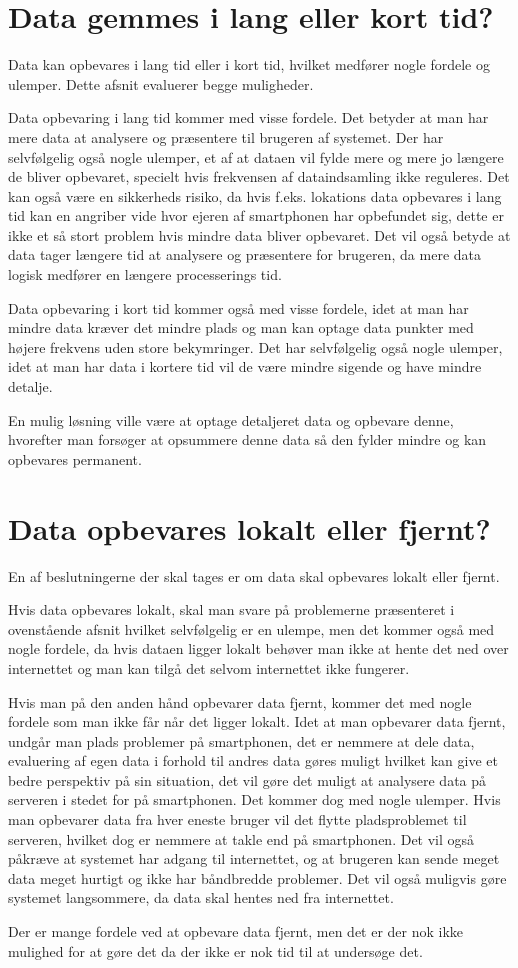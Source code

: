 \section{Data gemmes i lang eller kort tid?}
Data kan opbevares i lang tid eller i kort tid, hvilket medfører nogle fordele og ulemper. Dette afsnit evaluerer begge muligheder.

Data opbevaring i lang tid kommer med visse fordele. Det betyder at man har mere data at analysere og præsentere til brugeren af systemet.  
Der har selvfølgelig også nogle ulemper, et af at dataen vil fylde mere og mere jo længere de bliver opbevaret, specielt hvis frekvensen af dataindsamling ikke reguleres. Det kan også være en sikkerheds risiko, da hvis f.eks. lokations data opbevares i lang tid kan en angriber vide hvor ejeren af smartphonen har opbefundet sig, dette er ikke et så stort problem hvis mindre data bliver opbevaret. Det vil også betyde at data tager længere tid at analysere og præsentere for brugeren, da mere data logisk medfører en længere processerings tid.

Data opbevaring i kort tid kommer også med visse fordele, idet at man har mindre data kræver det mindre plads og man kan optage data punkter med højere frekvens uden store bekymringer. %
Det har selvfølgelig også nogle ulemper, idet at man har data i kortere tid vil de være mindre sigende og have mindre detalje. %

En mulig løsning ville være at optage detaljeret data og opbevare denne, hvorefter man forsøger at opsummere denne data så den fylder mindre og kan opbevares permanent. %

\section{Data opbevares lokalt eller fjernt?}
En af beslutningerne der skal tages er om data skal opbevares lokalt eller fjernt. 

Hvis data opbevares lokalt, skal man svare på problemerne præsenteret i ovenstående afsnit hvilket selvfølgelig er en ulempe, men det kommer også med nogle fordele, da hvis dataen ligger lokalt behøver man ikke at hente det ned over internettet og man kan tilgå det selvom internettet ikke fungerer.

Hvis man på den anden hånd opbevarer data fjernt, kommer det med nogle fordele som man ikke får når det ligger lokalt. Idet at man opbevarer data fjernt, undgår man plads problemer på smartphonen, det er nemmere at dele data, evaluering af egen data i forhold til andres data gøres muligt hvilket kan give et bedre perspektiv på sin situation, det vil gøre det muligt at analysere data på serveren i stedet for på smartphonen. 
Det kommer dog med nogle ulemper. Hvis man opbevarer data fra hver eneste bruger vil det flytte pladsproblemet til serveren, hvilket dog er nemmere at takle end på smartphonen. Det vil også påkræve at systemet har adgang til internettet, og at brugeren kan sende meget data meget hurtigt og ikke har båndbredde problemer. Det vil også muligvis gøre systemet langsommere, da data skal hentes ned fra internettet.

Der er mange fordele ved at opbevare data fjernt, men det er der nok ikke mulighed for at gøre det da der ikke er nok tid til at undersøge det.



